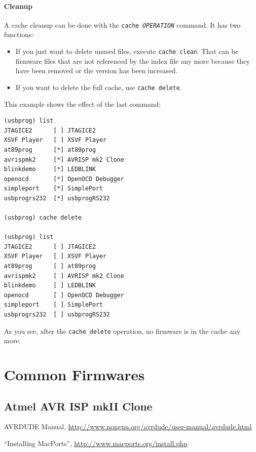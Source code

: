 \documentclass[bibtotoc,UKenglish,halfparskip,oneside,DIV12]{scrreprt}
\begin{document}
\subsubsection{Cleanup}

A cache cleanup can be done with the \texttt{cache \emph{OPERATION}} command. It has two functions:

\begin{itemize}
  \item If you just want to delete unused files, execute \texttt{cache clean}. That can be firmware
    files that are not referenced by the index file any more because they have been removed or the
    version has been increased.

  \item If you want to delete the full cache, use \texttt{cache delete}.
\end{itemize}

This example shows the effect of the last command:

\begin{lstlisting}[style=inline]
(usbprog) list
JTAGICE2      [ ] JTAGICE2
XSVF Player   [ ] XSVF Player
at89prog      [*] at89prog
avrispmk2     [*] AVRISP mk2 Clone
blinkdemo     [*] LEDBLINK
openocd       [*] OpenOCD Debugger
simpleport    [*] SimplePort
usbprogrs232  [*] usbprogRS232

(usbprog) cache delete 

(usbprog) list
JTAGICE2      [ ] JTAGICE2
XSVF Player   [ ] XSVF Player
at89prog      [ ] at89prog
avrispmk2     [ ] AVRISP mk2 Clone
blinkdemo     [ ] LEDBLINK
openocd       [ ] OpenOCD Debugger
simpleport    [ ] SimplePort
usbprogrs232  [ ] usbprogRS232
\end{lstlisting}

As you see, after the \texttt{cache delete} operation, no firmware is in the cache any more.


\chapter{Common Firmwares}
\label{sec:commonfirmwares}

\section{Atmel AVR ISP mkII Clone}

\begin{thebibliography}{99}
   AVRDUDE Manual,
    \url{http://www.nongnu.org/avrdude/user-manual/avrdude.html}

   ``Installing MacPorts'', \url{http://www.macports.org/install.php}
\end{thebibliography}
\end{document}
